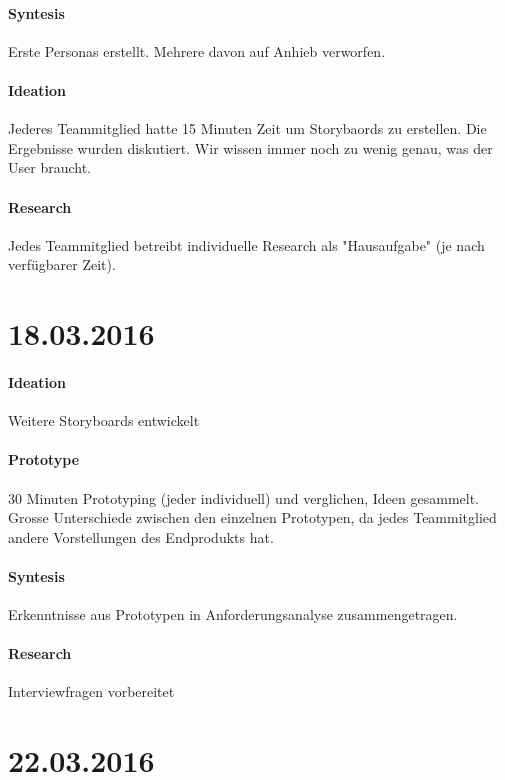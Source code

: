 \documentclass[a4paper]{scrreprt}
\begin{document}
\paragraph{Syntesis}
Erste Personas erstellt. Mehrere davon auf Anhieb verworfen.


\paragraph{Ideation}
Jederes Teammitglied hatte 15 Minuten Zeit um Storybaords zu erstellen. Die Ergebnisse wurden diskutiert. Wir wissen immer noch zu wenig genau, was der User braucht.

\paragraph{Research}
Jedes Teammitglied betreibt individuelle Research als "Hausaufgabe" (je nach verfügbarer Zeit).




\section*{18.03.2016}
\paragraph{Ideation}
Weitere Storyboards entwickelt


\paragraph{Prototype}
30 Minuten Prototyping (jeder individuell) und verglichen, Ideen gesammelt. Grosse Unterschiede zwischen den einzelnen Prototypen, da jedes Teammitglied andere Vorstellungen des Endprodukts hat.


\paragraph{Syntesis}
Erkenntnisse aus Prototypen in Anforderungsanalyse zusammengetragen.


\paragraph{Research}
Interviewfragen vorbereitet



\section*{22.03.2016}
\end{document}
